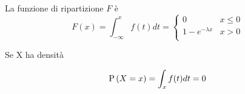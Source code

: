 \begin{defn}
    La funzione di ripartizione $ F $ è
    \begin{equation*}
        F(x) = \int_{-\infty}^{x} f(t) dt = \begin{cases}
            0 & x \leq 0 \\
            1 - e^{-\lambda x} & x > 0 \\
        \end{cases}
    \end{equation*}

\end{defn}

\begin{note}
    Se X ha densità

    \begin{equation*}
        \text{P}\left(X = x\right) = \int_x f(t) dt = 0
    \end{equation*}
\end{note}

